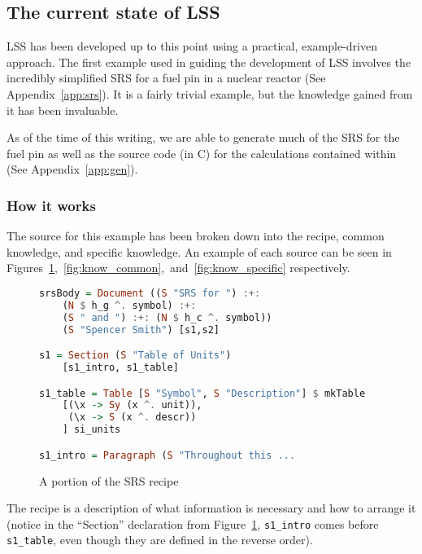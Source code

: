 \documentclass{sig-alternate-05-2015}
\newcommand{\lss}{LSS}
\begin{document}
%

\subsection{The current state of \lss} \label{ssec:example}

\lss{} has been developed up to this point using a practical, example-driven
approach. The first example used in guiding the development of \lss{} involves
the incredibly simplified SRS for a fuel pin in a nuclear reactor (See
Appendix~\ref{app:srs}). It is a fairly trivial example, but the knowledge
gained from it has been invaluable.

As of the time of this writing, we are able to generate much of the SRS for the
fuel pin as well as the source code (in C) for the calculations contained within
(See Appendix~\ref{app:gen}).

\subsubsection{How it works} \label{sssec:ex_how}

The source for this example has been broken down into the recipe, common
knowledge, and specific knowledge.  An example of each source can be seen in
Figures~\ref{fig:recipe},~\ref{fig:know_common},~and~\ref{fig:know_specific}
respectively.

\begin{figure}
\begin{lstlisting}[language=Haskell, frame=single, showstringspaces=false, basicstyle=\tiny]
srsBody = Document ((S "SRS for ") :+: 
    (N $ h_g ^. symbol) :+: 
    (S " and ") :+: (N $ h_c ^. symbol)) 
    (S "Spencer Smith") [s1,s2]

s1 = Section (S "Table of Units") 
    [s1_intro, s1_table]

s1_table = Table [S "Symbol", S "Description"] $ mkTable
    [(\x -> Sy (x ^. unit)),
     (\x -> S (x ^. descr))
    ] si_units

s1_intro = Paragraph (S "Throughout this ...
\end{lstlisting}
\caption{A portion of the SRS recipe}
\label{fig:recipe}
\end{figure}

The recipe is a description of what information is necessary and how to arrange
it (notice in the ``Section'' declaration from Figure~\ref{fig:recipe},
\verb|s1_intro| comes before \verb|s1_table|, even though they are defined in
the reverse order).
\end{document}
